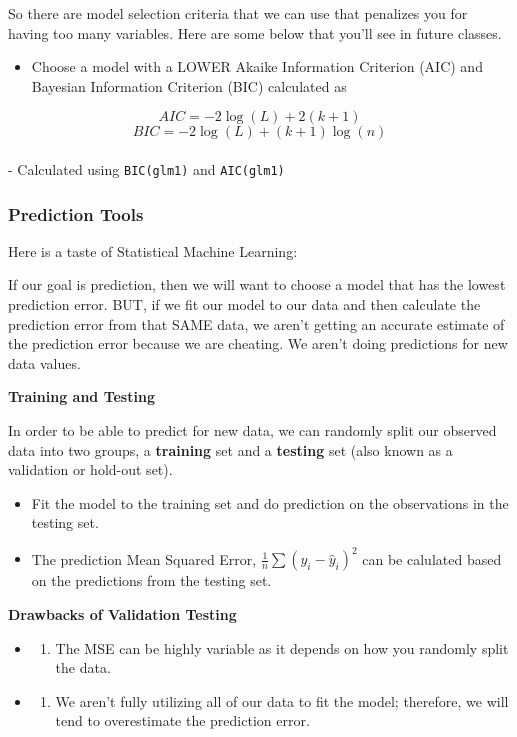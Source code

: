 \documentclass[
]{book}
\providecommand{\tightlist}{%
  \setlength{\itemsep}{0pt}\setlength{\parskip}{0pt}}
\begin{document}
So there are model selection criteria that we can use that penalizes you for having too many variables. Here are some below that you'll see in future classes.

\begin{itemize}
\tightlist
\item
  Choose a model with a LOWER Akaike Information Criterion (AIC) and Bayesian Information Criterion (BIC) calculated as
\end{itemize}

\[AIC = -2\log(L) + 2(k+1)\]
\[BIC= -2\log(L) + (k+1)\log(n)\]\\
- Calculated using \texttt{BIC(glm1)} and \texttt{AIC(glm1)}

\subsubsection{Prediction Tools}\label{prediction-tools}

Here is a taste of Statistical Machine Learning:

If our goal is prediction, then we will want to choose a model that has the lowest prediction error. BUT, if we fit our model to our data and then calculate the prediction error from that SAME data, we aren't getting an accurate estimate of the prediction error because we are cheating. We aren't doing predictions for new data values.

\textbf{Training and Testing}

In order to be able to predict for new data, we can randomly split our observed data into two groups, a \textbf{training} set and a \textbf{testing} set (also known as a validation or hold-out set).

\begin{itemize}
\tightlist
\item
  Fit the model to the training set and do prediction on the observations in the testing set.
\item
  The prediction Mean Squared Error, \(\frac{1}{n}\sum(y_i - \hat{y}_i)^2\) can be calulated based on the predictions from the testing set.
\end{itemize}

\textbf{Drawbacks of Validation Testing}

\begin{itemize}
\tightlist
\item
  \begin{enumerate}
  \def\labelenumi{\arabic{enumi})}
  \tightlist
  \item
    The MSE can be highly variable as it depends on how you randomly split the data.
  \end{enumerate}
\item
  \begin{enumerate}
  \def\labelenumi{\arabic{enumi})}
  \setcounter{enumi}{1}
  \tightlist
  \item
    We aren't fully utilizing all of our data to fit the model; therefore, we will tend to overestimate the prediction error.
  \end{enumerate}
\end{itemize}
\end{document}
